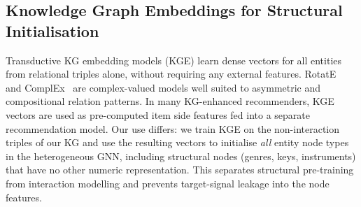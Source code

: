 \subsection{Knowledge Graph Embeddings for Structural Initialisation}

Transductive KG embedding models (KGE) learn dense vectors for all entities from relational triples alone, without requiring any external features. RotatE~\cite{sun2019rotate} and ComplEx~\cite{trouillon2016complex} are complex-valued models well suited to asymmetric and compositional relation patterns. In many KG-enhanced recommenders, KGE vectors are used as pre-computed item side features fed into a separate recommendation model. Our use differs: we train KGE on the non-interaction triples of our KG and use the resulting vectors to initialise \emph{all} entity node types in the heterogeneous GNN, including structural nodes (genres, keys, instruments) that have no other numeric representation. This separates structural pre-training from interaction modelling and prevents target-signal leakage into the node features.
